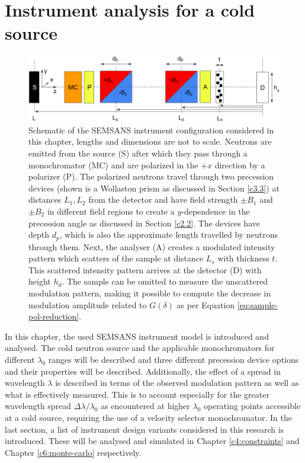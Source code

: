 \chapter{Instrument analysis for a cold source}
\label{chapter:introduction}
\label{c3}
\begin{figure}[hbtp]
	\centering
	\includegraphics[width=\linewidth]{instrument-configuration}
	\caption{Schematic of the SEMSANS instrument configuration considered in this chapter, lengths and dimensions are not to scale. Neutrons are emitted from the source (S) after which they pass through a monochromator (MC) and are polarized in the $+x$ direction by a polarizer (P). The polarized neutrons travel through two precession devices (shown is a Wollaston prism as discussed in Section \ref{c3.3}) at distances $L_1, L_2$ from the detector and have field strength $\pm B_1$ and $\pm B_2$ in different field regions to create a $y$-dependence in the precession angle as discussed in Section \ref{c2.2}. The devices have depth $d_p$, which is also the approximate length travelled by neutrons through them. Next, the analyser (A) creates a modulated intensity pattern which scatters of the sample at distance $L_s$ with thickness $t$. This scattered intensity pattern arrives at the detector (D) with height $h_d$. The sample can be omitted to measure the unscattered modulation pattern, making it possible to compute the decrease in modulation amplitude related to $G(\delta)$ as per Equation \eqref{eq:sample-pol-reduction}.}
	\label{fig:instrument-config}
\end{figure}

In this chapter, the used SEMSANS instrument model is introduced and analysed. The cold neutron source and the applicable monochromators for different $\lambda_0$ ranges will be described and three different precession device options and their properties will be described. Additionally, the effect of a spread in wavelength $\lambda$ is described in terms of the observed modulation pattern as well as what is effectively measured. This is to account especially for the greater wavelength spread $\Delta\lambda/\lambda_0$ as encountered at higher $\lambda_0$ operating points accessible at a cold source, requiring the use of a velocity selector monochromator. In the last section, a list of instrument design variants considered in this research is introduced. These will be analysed and simulated in Chapter \ref{c4:constraints} and Chapter \ref{c6:monte-carlo} respectively. 

